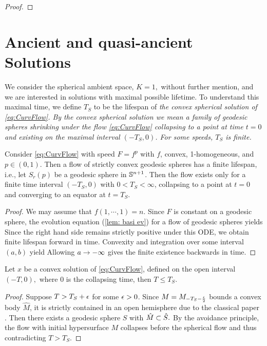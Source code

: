 \documentclass{amsart}
\begin{document}
\begin{proof}
\end{proof}

\section{Ancient and quasi-ancient Solutions}\label{quasi}
\label{sec:quasi_ancient}

We consider the spherical ambient space, $K=1,$ without further mention, and we are interested in solutions with maximal possible lifetime. To understand this maximal time, we define $T_S$ to be the lifespan of \it{the} convex spherical solution of \eqref{eq:CurvFlow}. By the convex spherical solution we mean a family of geodesic spheres shrinking under the flow \eqref{eq:CurvFlow} collapsing to a point at time $t=0$ and existing on the maximal interval \((-T_S, 0)\). For some speeds, \(T_S\) is finite.

\begin{lemma}
 Consider \eqref{eq:CurvFlow} with speed \(F = f^p\) with \(f\), convex, 1-homogeneous, and \(p \in (0,1)\). Then a flow of strictly convex geodesic spheres has a finite lifespan, i.e., let $S_r(p)$ be a geodesic sphere in $\S^{n+1}$. Then the flow exists only for a finite time interval \((-T_S,0)\) with \(0 < T_S < \infty\), collapsing to a point at \(t=0\) and converging to an equator at \(t=T_S\).
\end{lemma}

\begin{proof}
We may assume that $f(1,\cdots,1)=n.$
Since $F$ is constant on a geodesic sphere, the evolution equation (\ref{lem: basi ev}) for a flow of geodesic spheres yields
Since the right hand side remains strictly positive under this ODE, we obtain finite lifespan forward in time.
Convexity and integration over some interval $(a,b)$ yield
Allowing $a\ra-\8$ gives the finite existence backwards in time.
\end{proof}

\begin{lemma}
Let $x$ be a convex solution of \eqref{eq:CurvFlow}, defined on the open interval $(-T,0),$ where $0$ is the collapsing time, then $T\leq T_S.$
\end{lemma}

\begin{proof}
Suppose $T>T_S+\e$ for some $\e>0$. Since $M=M_{-T_S-\fr{\e}{2}}$ bounds a convex body $\hat{M}$, it is strictly contained in an open hemisphere due to the classical paper \cite{CarmoWarner:/1970}. Then there exists a geodesic sphere $S$ with $\hat{M}\sub\hat{S}.$ By the avoidance principle, the flow with initial hypersurface $M$ collapses before the spherical flow and thus contradicting $T>T_S$.
\end{proof}
\end{document}
